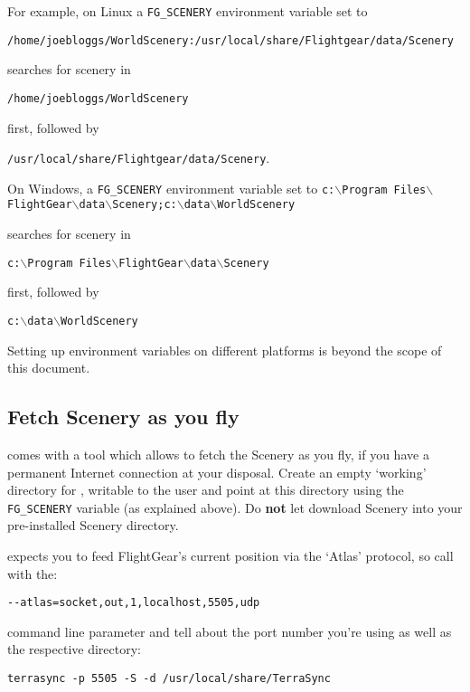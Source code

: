 For example, on Linux a \texttt{FG\_SCENERY} environment variable set to

\noindent
\texttt{/home/joebloggs/WorldScenery:/usr/local/share/Flightgear/data/Scenery}

\noindent
searches for scenery in

\noindent
\texttt{/home/joebloggs/WorldScenery}

\noindent
first, followed by

\noindent
\texttt{/usr/local/share/Flightgear/data/Scenery}.

\medskip
On Windows, a \texttt{FG\_SCENERY} environment variable set to
\texttt{c:$\backslash$Program Files$\backslash$FlightGear$\backslash$data$\backslash$Scenery;c:$\backslash$data$\backslash$WorldScenery}

\noindent
searches for scenery in

\noindent
\texttt{c:$\backslash$Program Files$\backslash$FlightGear$\backslash$data$\backslash$Scenery}


\noindent
first, followed by

\noindent
\texttt{c:$\backslash$data$\backslash$WorldScenery}

\medskip
Setting up environment variables on different platforms is beyond the scope of this document.

\subsection{Fetch Scenery as you fly}

\FlightGear{} comes with a tool \TerraSync{} which
allows to fetch the Scenery as you fly, if you have a permanent
Internet connection at your disposal. Create an empty `working'
directory for \TerraSync{}, writable to the user and point
\FlightGear{} at this directory using the \texttt{FG\_SCENERY} variable
(as explained above). Do \textbf{not} let \TerraSync{} download Scenery
into your pre-installed Scenery directory.

\TerraSync{} expects you to feed FlightGear's current position via the
`Atlas' protocol, so call \FlightGear{} with the:

\texttt{-$ $-atlas=socket,out,1,localhost,5505,udp}

command line parameter and tell \TerraSync{} about the port number you're
using as well as the respective directory:

\texttt{terrasync -p 5505 -S -d /usr/local/share/TerraSync}
\medskip

